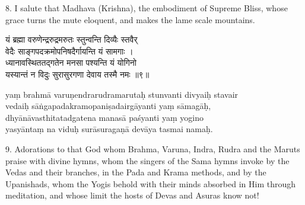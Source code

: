 8. I salute that Madhava (Krishna), the embodiment of Supreme Bliss, whose
grace turns the mute eloquent, and makes the lame scale mountains.

\begin{gitaverse}
यं ब्रह्मा वरुणेन्द्ररुद्रमरुतः स्तुन्वन्ति दिव्यैः स्तवैर् \\
\tab वेदैः साङ्गपदक्रमोपनिषदैर्गायन्ति यं सामगाः । \\
ध्यानावस्थिततद्गतेन मनसा पश्यन्ति यं योगिनो \\
\tab यस्यान्तं न विदुः सुरासुरगणा देवाय तस्मै नमः ॥९॥
\end{gitaverse}

\begin{transliteration}
yaṃ brahmā varuṇendrarudramarutaḥ stunvanti divyaiḥ stavair \\
\tab vedaiḥ sāṅgapadakramopaniṣadairgāyanti yaṃ sāmagāḥ, \\
dhyānāvasthitatadgatena manasā paśyanti yaṃ yogino \\
\tab yasyāntaṃ na viduḥ surāsuragaṇā devāya tasmai namaḥ.
\end{transliteration}

9. Adorations to that God whom Brahma, Varuna, Indra, Rudra and the Maruts
praise with divine hymns, whom the singers of the Sama hymns invoke by the
Vedas and their branches, in the Pada and Krama methods, and by the Upanishads,
whom the Yogis behold with their minds absorbed in Him through meditation, and
whose limit the hosts of Devas and Asuras know not!
